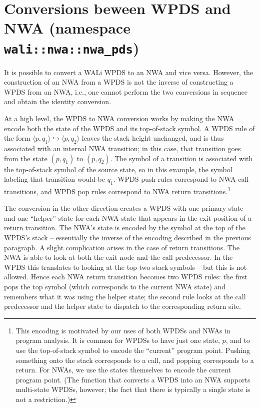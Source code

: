 \section{Conversions beween WPDS and NWA (namespace
  \texttt{wali::nwa::nwa\_pds})}
\label{Se:Conversions}


It is possible to convert a WALi WPDS to an NWA and vice versa.
However, the construction of an NWA from a WPDS is not the inverse
of constructing a WPDS from an NWA, i.e., one cannot perform the two
conversions in sequence and obtain the identity conversion.

At a high level, the WPDS to NWA conversion works by making the NWA encode both the state
of the WPDS and its top-of-stack symbol. A WPDS rule of the form $\langle
p,q_1 \rangle \hookrightarrow \langle p,q_2 \rangle$ leaves the stack height
unchanged, and is thus associated with an internal NWA transition; in this
case, that transition goes from the state $(p,q_1)$ to $(p,q_2)$. The symbol
of a transition is associated with the top-of-stack symbol of the source
state, so in this example, the symbol labeling that transition would be
$q_1$. WPDS push rules correspond to NWA call transitions, and WPDS pop rules
correspond to NWA return transitions.\footnote{
This encoding is motivated by our uses of both WPDSs and NWAs in program
analysis. It is common for WPDSs to have just one state, $p$, and to use the
top-of-stack symbol to encode the ``current'' program point. Pushing
something onto the stack corresponds to a call, and popping corresponds to a
return. For NWAs, we use the states themselves to encode the current program
point. (The function that
converts a WPDS into an NWA supports multi-state WPDSs, however; the fact that
there is typically a single state is not a restriction.)}

The conversion in the other direction creates a WPDS with one primary state
and one ``helper'' state for each NWA state that appears in the exit position
of a return transition. The NWA's state is encoded by the symbol at the top of the WPDS's
stack -- essentially the inverse of the encoding described in the previous
paragraph. A slight complication arises in the case of return
transitions. The NWA is able to look at both the exit node and the call
predecessor. In the WPDS this translates to looking at the top two stack
symbols -- but this is not allowed. Hence each NWA return transition becomes
two WPDS rules: the first pops the top symbol (which corresponds to the
current NWA state) and remembers what it was using the helper state; the
second rule looks at the call predecessor and the helper state to dispatch to
the corresponding return site.

